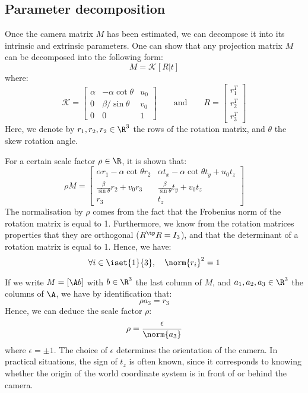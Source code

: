\subsection{Parameter decomposition}
Once the camera matrix $M$ has been estimated, we can decompose it into its intrinsic and extrinsic parameters. One can show that any projection matrix $M$ can be decomposed into the following form:
\begin{equation*}
    M=\mathcal{K} [R | t]
\end{equation*}
where:
\begin{equation*}
    \mathcal{K} = \begin{bmatrix}
        \alpha&-\alpha\cot\theta&u_0\\
        0 & \beta/\sin\theta & v_0\\
        0 & 0 & 1
    \end{bmatrix}
    \quad\quad\text{and}\quad\quad
    R = \begin{bmatrix} r_1^T \\ r_2^T \\ r_3^T \end{bmatrix}
\end{equation*}
Here, we denote by $r_1, r_2, r_2\in\R^3$ the rows of the rotation matrix, and $\theta$ the skew rotation angle.

For a certain scale factor $\rho\in\R$, it is shown that:
\begin{equation*}
    \rho M = \begin{bmatrix}
        \alpha r_1 - \alpha\cot\theta r_2 & \alpha t_x-\alpha\cot\theta t_y+u_0 t_z\\
        \frac{\beta}{\sin\theta}r_2 + v_0 r_3 & \frac{\beta}{\sin\theta}t_y+v_0 t_z\\
        r_3 & t_z
    \end{bmatrix}
\end{equation*}
The normalisation by $\rho$ comes from the fact that the Frobenius norm of the rotation matrix is equal to 1. Furthermore, we know from the rotation matrices properties that they are orthogonal ($R^\tp R=I_3$), and that the determinant of a rotation matrix is equal to 1. Hence, we have:
\begin{equation*}
    \forall i\in\iset{1}{3}, \quad \norm{r_i}^2 = 1
\end{equation*}

If we write $M=[\A b]$ with $b\in\R^3$ the last column of $M$, and $a_1, a_2, a_3\in\R^3$ the columns of $\A$, we have by identification that:
\begin{equation*}
    \rho a_3 = r_3
\end{equation*}
Hence, we can deduce the scale factor $\rho$:
\begin{equation*}
    \rho = \frac{\epsilon}{\norm{a_3}}
\end{equation*}
where $\epsilon=\pm 1$. The choice of $\epsilon$ determines the orientation of the camera. In practical situations, the sign of $t_z$ is often known, since it corresponds to knowing whether the origin of the world coordinate system is in front of or behind the camera.

